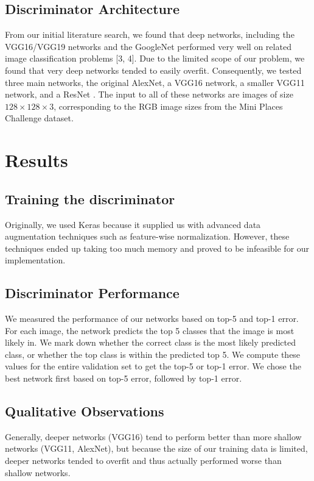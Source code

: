 \documentclass[10pt,twocolumn,letterpaper]{article}
\begin{document}
\subsection{Discriminator Architecture}

From our initial literature search, we found that deep networks, including the VGG16/VGG19 networks and the GoogleNet performed very well on related image classification problems [3, 4]. Due to the limited scope of our problem, we found that very deep networks tended to easily overfit. Consequently, we tested three main networks, the original AlexNet, a VGG16 network, a smaller VGG11 network, and a ResNet . The input to all of these networks are images of size $128 \times 128 \times 3$, corresponding to the RGB image sizes from the Mini Places Challenge dataset. 

\section{Results}

\subsection{Training the discriminator}
Originally, we used Keras because it supplied us with advanced data augmentation techniques such as feature-wise normalization. However, these techniques ended up taking too much memory and proved to be infeasible for our implementation. 

\subsection{Discriminator Performance}
We measured the performance of our networks based on top-5 and top-1 error. For each image, the network predicts the top 5 classes that the image is most likely in. We mark down whether the correct class is the most likely predicted class, or whether the top class is within the predicted top 5. We compute these values for the entire validation set to get the top-5 or top-1 error. We chose the best network first based on top-5 error, followed by top-1 error. 

\subsection{Qualitative Observations}

Generally, deeper networks (VGG16) tend to perform better than more shallow networks (VGG11, AlexNet), but because the size of our training data is limited, deeper networks tended to overfit and thus actually performed worse than shallow networks. 
\end{document}
